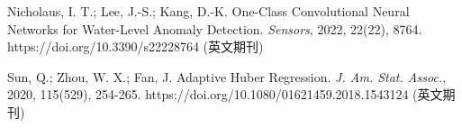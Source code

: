 \documentclass[UTF8,a4paper,fontset=none]{ctexart}
\begin{document}
{\begin{thebibliography}{99}
     Nicholaus, I. T.; Lee, J.-S.; Kang, D.-K. One-Class Convolutional Neural Networks for Water-Level Anomaly Detection. \textit{Sensors}, 2022, 22(22), 8764. https://doi.org/10.3390/s22228764	(英文期刊)

     Sun, Q.; Zhou, W. X.; Fan, J. Adaptive Huber Regression. \textit{J. Am. Stat. Assoc.}, 2020, 115(529), 254-265. https://doi.org/10.1080/01621459.2018.1543124	(英文期刊)

\end{thebibliography}

}
\end{document}
